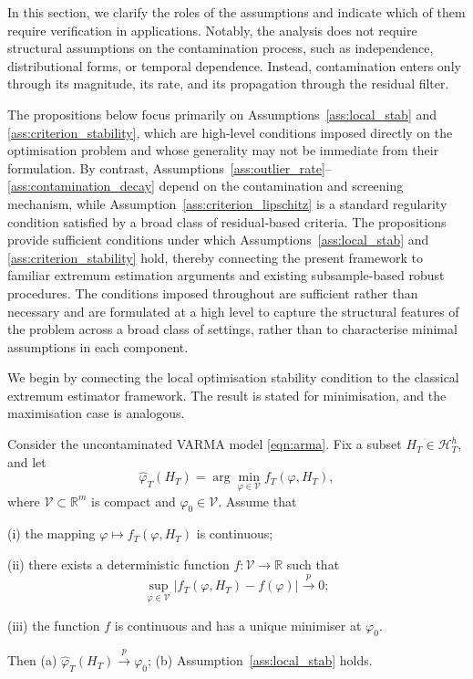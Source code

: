 \documentclass[12pt]{article}
\numberwithin{equation}{section}
\begin{document}
In this section, we clarify the roles of the assumptions and indicate which of them require verification in applications.
Notably, the analysis does not require structural assumptions on the contamination process, such as independence, distributional forms, or temporal dependence.
Instead, contamination enters only through its magnitude, its rate, and its propagation through the residual filter.

The propositions below focus primarily on Assumptions~\ref{ass:local_stab} and \ref{ass:criterion_stability}, which are high-level conditions imposed directly on the optimisation problem and whose generality may not be immediate from their formulation.
By contrast, Assumptions~\ref{ass:outlier_rate}--\ref{ass:contamination_decay} depend on the contamination and screening mechanism, while Assumption~\ref{ass:criterion_lipschitz} is a standard regularity condition satisfied by a broad class of residual-based criteria.
The propositions provide sufficient conditions under which Assumptions~\ref{ass:local_stab} and \ref{ass:criterion_stability} hold, thereby connecting the present framework to familiar extremum estimation arguments and existing subsample-based robust procedures.
The conditions imposed throughout are sufficient rather than necessary and are formulated at a high level to capture the structural features of the problem across a broad class of settings, rather than to characterise minimal assumptions in each component.

We begin by connecting the local optimisation stability condition to the classical extremum estimator framework.
The result is stated for minimisation, and the maximisation case is analogous.

\begin{proposition}
\label{prop:extremum_to_localstab}
Consider the uncontaminated VARMA model \eqref{eqn:arma}. Fix a subset
$H_T \in \mathcal H_T^h$, and let
\begin{equation}
\hat{\varphi}_T(H_T)
=
\arg\min_{\varphi\in\mathcal V} f_T(\varphi,H_T),
\end{equation}
where $\mathcal V \subset \mathbb R^m$ is compact and $\varphi_0 \in \mathcal V$.
Assume that

\noindent
(i) the mapping
$\varphi \mapsto f_T(\varphi,H_T)$
is continuous;

\noindent
(ii) there exists a deterministic function $f:\mathcal V\to\mathbb R$ such that
\begin{equation}
\sup_{\varphi\in\mathcal V}
\bigl|f_T(\varphi,H_T)-f(\varphi)\bigr|
\overset{p}{\longrightarrow}0;
\end{equation}

\noindent
(iii) the function $f$ is continuous and has a unique minimiser at $\varphi_0$.

Then
(a) $\hat{\varphi}_T(H_T)\overset{p}{\longrightarrow}\varphi_0$;
(b) Assumption~\ref{ass:local_stab} holds.
\end{proposition}
\end{document}
